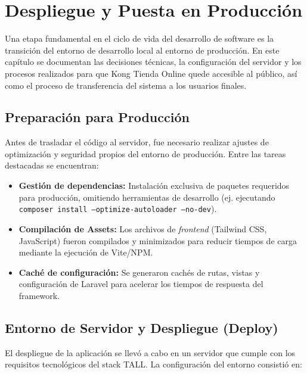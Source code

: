 \chapter{Despliegue y Puesta en Producción}
\label{cap:despliegue}

Una etapa fundamental en el ciclo de vida del desarrollo de software es la transición del entorno de desarrollo local al entorno de producción. En este capítulo se documentan las decisiones técnicas, la configuración del servidor y los procesos realizados para que Kong Tienda Online quede accesible al público, así como el proceso de transferencia del sistema a los usuarios finales.

\section{Preparación para Producción}

Antes de trasladar el código al servidor, fue necesario realizar ajustes de optimización y seguridad propios del entorno de producción. Entre las tareas destacadas se encuentran:

\begin{itemize}
    \item \textbf{Gestión de dependencias:} Instalación exclusiva de paquetes requeridos para producción, omitiendo herramientas de desarrollo (ej. ejecutando \texttt{composer install --optimize-autoloader --no-dev}).
    \item \textbf{Compilación de Assets:} Los archivos de \textit{frontend} (Tailwind CSS, JavaScript) fueron compilados y minimizados para reducir tiempos de carga mediante la ejecución de Vite/NPM.
    \item \textbf{Caché de configuración:} Se generaron cachés de rutas, vistas y configuración de Laravel para acelerar los tiempos de respuesta del framework.
\end{itemize}

\section{Entorno de Servidor y Despliegue (Deploy)}


El despliegue de la aplicación se llevó a cabo en un servidor %
que cumple con los requisitos tecnológicos del stack TALL. La configuración del entorno consistió en:

